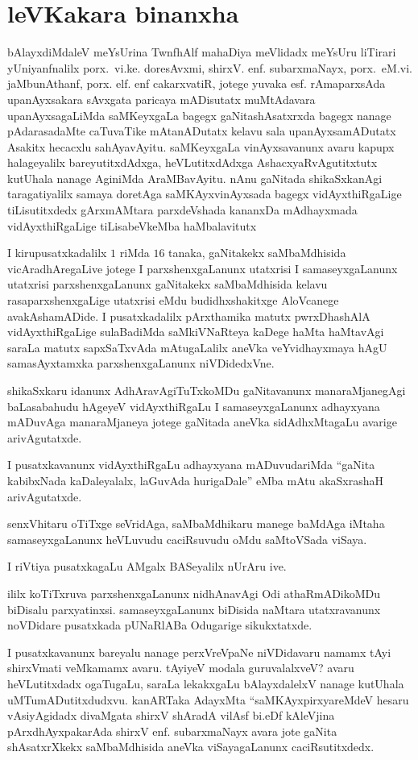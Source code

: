  \chapter*{leVKakara binanxha}

 bAlayxdiMdaleV meYsUrina TwnfhAlf mahaDiya meVlidadx meYsUru liTirari yUniyanfnalilx porx.~vi.ke. doresAvxmi, shirxV. enf. subarxmaNayx, porx.~eM.vi. jaMbunAthanf, porx. elf. enf cakarxvatiR, jotege yuvaka esf. rAmaparxsAda upanAyxsakara sAvxgata paricaya mADisutatx muMtAdavara upanAyxsagaLiMda saMKeyxgaLa bagegx gaNitashAsatxrxda bagegx nanage pAdarasadaMte caTuvaTike mAtanADutatx kelavu sala upanAyxsamADutatx Asakitx hecacxlu sahAyavAyitu. saMKeyxgaLa vinAyxsavanunx avaru kapupx halageyalilx bareyutitxdAdxga, heVLutitxdAdxga AshacxyaRvAgutitxtutx kutUhala nanage AginiMda AraMBavAyitu. nAnu gaNitada shikaSxkanAgi taragatiyalilx samaya doretAga saMKAyxvinAyxsada bagegx vidAyxthiRgaLige tiLisutitxdedx gArxmAMtara parxdeVshada kananxDa mAdhayxmada vidAyxthiRgaLige tiLisabeVkeMba haMbalavitutx

 I kirupusatxkadalilx $1$ riMda $16$ tanaka, gaNitakekx saMbaMdhisida vicAradhAregaLive jotege I parxshenxgaLanunx utatxrisi I samaseyxgaLanunx utatxrisi parxshenxgaLanunx gaNitakekx saMbaMdhisida kelavu rasaparxshenxgaLige utatxrisi eMdu budidhxshakitxge AloVcanege avakAshamADide. I pusatxkadalilx pArxthamika matutx pwrxDhashAlA vidAyxthiRgaLige sulaBadiMda saMkiVNaRteya kaDege haMta haMtavAgi saraLa matutx sapxSaTxvAda mAtugaLalilx aneVka veYvidhayxmaya hAgU samasAyxtamxka parxshenxgaLanunx niVDidedxVne.

 shikaSxkaru idanunx AdhAravAgiTuTxkoMDu gaNitavanunx manaraMjanegAgi baLasabahudu hAgeyeV vidAyxthiRgaLu I samaseyxgaLanunx adhayxyana mADuvAga manaraMjaneya jotege gaNitada aneVka sidAdhxMtagaLu avarige arivAgutatxde.

 I pusatxkavanunx vidAyxthiRgaLu adhayxyana mADuvudariMda ``gaNita kabibxNada kaDaleyalalx, laGuvAda hurigaDale'' eMba mAtu akaSxrashaH arivAgutatxde.

 senxVhitaru oTiTxge seVridAga, saMbaMdhikaru manege baMdAga iMtaha samaseyxgaLanunx heVLuvudu caciRsuvudu oMdu saMtoVSada viSaya.

 I riVtiya pusatxkagaLu AMgalx BASeyalilx nUrAru ive.

 ililx koTiTxruva parxshenxgaLanunx nidhAnavAgi Odi athaRmADikoMDu biDisalu parxyatinxsi. samaseyxgaLanunx biDisida naMtara utatxravanunx noVDidare pusatxkada pUNaRlABa Odugarige sikukxtatxde.

 I pusatxkavanunx bareyalu nanage perxVreVpaNe niVDidavaru namamx tAyi shirxVmati veMkamamx avaru. tAyiyeV modala guruvalalxveV? avaru heVLutitxdadx ogaTugaLu, saraLa lekakxgaLu bAlayxdalelxV nanage kutUhala uMTumADutitxdudxvu. kanARTaka AdayxMta ``saMKAyxpirxyareMdeV hesaru vAsiyAgidadx divaMgata shirxV shAradA vilAsf bi.eDf kAleVjina pArxdhAyxpakarAda shirxV enf. subarxmaNayx avara jote gaNita shAsatxrXkekx saMbaMdhisida aneVka viSayagaLanunx caciRsutitxdedx.

